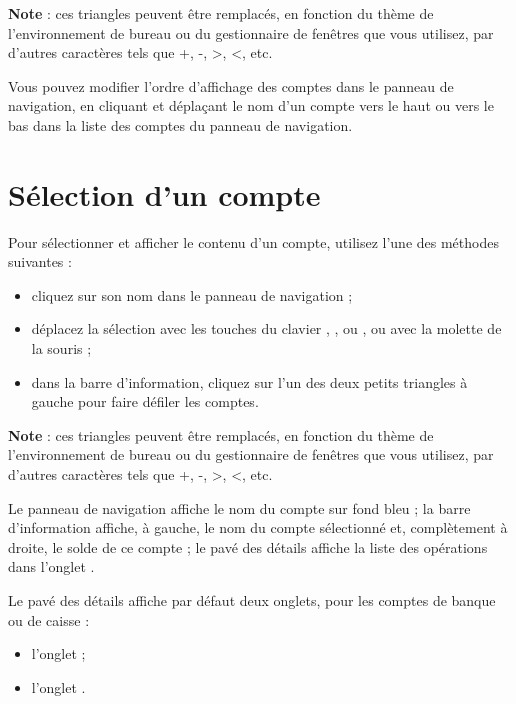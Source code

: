 \textbf{Note} : ces triangles peuvent être remplacés, en fonction du thème de l'environnement de bureau ou du gestionnaire de fenêtres que vous utilisez, par d'autres caractères tels que +, -, >, <, etc.


Vous pouvez modifier l'ordre d'affichage des comptes dans le panneau de navigation, en cliquant et déplaçant le nom d'un compte vers le haut ou vers le bas dans la liste des comptes du panneau de navigation.


\section{Sélection d'un compte\label{accounts-selection}}


Pour sélectionner et afficher le contenu d'un compte, utilisez l'une des méthodes suivantes :

\begin{itemize}
	 \item cliquez sur son nom dans le panneau de navigation ;
	 \item déplacez la sélection avec les touches  du clavier ,  ,  ou , ou avec la molette de la souris ;
	 \item dans la barre d'information, cliquez sur l'un des deux petits triangles à gauche pour faire défiler les comptes.
\end{itemize}

\textbf{Note} : ces triangles peuvent être remplacés, en fonction du thème de l'environnement de bureau ou du gestionnaire de fenêtres que vous utilisez, par d'autres caractères tels que +, -, >, <, etc.

Le panneau de navigation affiche le nom du compte sur fond bleu{\couleur} ; la barre d'information affiche, à gauche, le nom du compte sélectionné et, complètement à droite, le solde de ce compte ; le pavé des détails affiche la liste des opérations dans l'onglet .

Le pavé des détails affiche par défaut deux onglets, pour les comptes de banque ou de caisse :
\begin{itemize}
	 \item l'onglet  ;
	 \item l'onglet .
\end{itemize}

